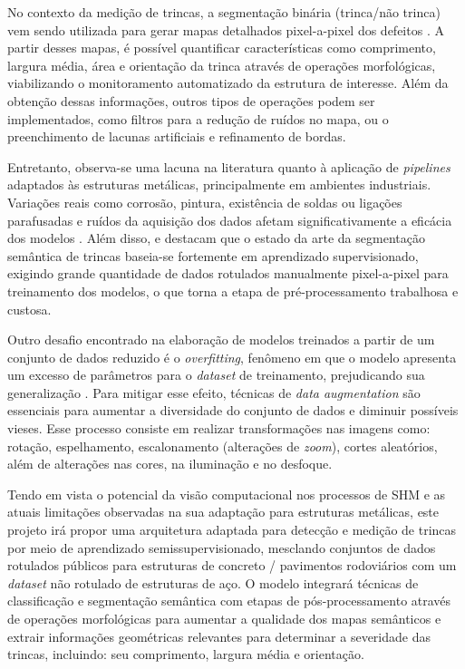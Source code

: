 \documentclass[12pt]{article}
\begin{document}
No contexto da medição de trincas, a segmentação binária (trinca/não trinca) vem sendo utilizada para gerar mapas detalhados pixel-a-pixel dos defeitos \cite{13bhowmick2020vision}. A partir desses mapas, é possível quantificar características como comprimento, largura média, área e orientação da trinca através de operações morfológicas, viabilizando o monitoramento automatizado da estrutura de interesse. Além da obtenção dessas informações, outros tipos de operações podem ser implementados, como filtros para a redução de ruídos no mapa, ou o preenchimento de lacunas artificiais e refinamento de bordas.

Entretanto, observa-se uma lacuna na literatura quanto  à aplicação de \textit{pipelines} adaptados às estruturas metálicas, principalmente em ambientes industriais. Variações reais como corrosão, pintura, existência de soldas ou ligações parafusadas e ruídos da aquisição dos dados afetam significativamente a eficácia dos modelos \cite{12li2021deep}. Além disso,  \textcite{14konig2022s} e \textcite{15wang2021semi} destacam que o estado da arte da segmentação semântica de trincas baseia-se fortemente em aprendizado supervisionado, exigindo grande quantidade de dados rotulados manualmente pixel-a-pixel para treinamento dos modelos, o que torna a etapa de pré-processamento trabalhosa e custosa. 

Outro desafio encontrado na elaboração de modelos treinados a partir de um conjunto de dados reduzido é o \textit{overfitting}, fenômeno em que o modelo apresenta um excesso de parâmetros para o \textit{dataset} de treinamento, prejudicando sua generalização \cite{6shorten2019survey}. Para mitigar esse efeito, técnicas de \textit{data augmentation} são essenciais para aumentar a diversidade do conjunto de dados e diminuir possíveis vieses. Esse processo consiste em realizar transformações nas imagens como: rotação, espelhamento, escalonamento (alterações de \textit{zoom}), cortes aleatórios, além de alterações nas cores, na iluminação e no desfoque.

Tendo em vista o potencial da visão computacional nos processos de SHM e as atuais limitações observadas na sua adaptação para estruturas metálicas, este projeto irá propor uma arquitetura adaptada para detecção e medição de trincas por meio de aprendizado semissupervisionado, mesclando conjuntos de dados rotulados públicos para estruturas de concreto / pavimentos rodoviários com um \textit{dataset} não rotulado de estruturas de aço. O modelo integrará técnicas de classificação e segmentação semântica com etapas de pós-processamento através de operações morfológicas %
para aumentar a qualidade dos mapas semânticos e extrair informações geométricas relevantes para determinar a severidade das trincas, incluindo: seu comprimento, largura média e orientação.
\end{document}
